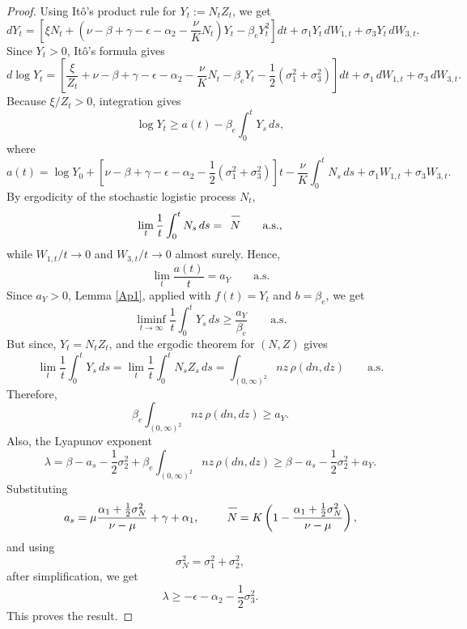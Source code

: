 \documentclass[12pt,a4paper,reqno]{amsart}
\theoremstyle{definition}
\theoremstyle{remark}
\theoremstyle{plain}
\let\svoverline\overline
\newcommand{\uc}[1]{\mkern 5mu\svoverline{\mkern-1mu#1\mkern-0.3mu \rule{0pt}{3.5mm}}\mkern 0mu}
\let\overline\uc
\begin{document}
\begin{proof}
Using It\^o's product rule for $Y_t:=N_tZ_t$, we get
$$
dY_t=\left[\xi N_t+\left(\nu-\beta+\gamma-\epsilon-\alpha_2
-\frac{\nu}{K}N_t\right)Y_t-\beta_eY_t^2\right]dt
+\sigma_1Y_t\,dW_{1,t}+\sigma_3Y_t\,dW_{3,t}.
$$
Since $Y_t>0$, It\^o's formula gives
$$
d\log Y_t=\left[\frac{\xi}{Z_t}+\nu-\beta+\gamma-\epsilon-\alpha_2-\frac{\nu}{K}N_t-\beta_eY_t-\frac12(\sigma_1^2+\sigma_3^2)
\right]dt+\sigma_1\,dW_{1,t}+\sigma_3\,dW_{3,t}.
$$
Because $\xi/Z_t>0$, integration gives
$$
\log Y_t \geq a(t)-\beta_e\int_0^tY_s\,ds,
$$
where
$$
a(t)=\log Y_0+\left[\nu-\beta+\gamma-\epsilon-\alpha_2
-\frac12(\sigma_1^2+\sigma_3^2)\right]t
-\frac{\nu}{K}\int_0^tN_s\,ds+\sigma_1W_{1,t}+\sigma_3W_{3,t}.
$$
By ergodicity of the stochastic logistic process $N_t$,
$$
\lim_t \frac1t\int_0^tN_s\,ds
=
\overline N
\qquad\text{a.s.},
$$
while $W_{1,t}/t\to0$ and $W_{3,t}/t\to0$ almost surely. Hence,
$$
\lim_t \frac{a(t)}{t}= a_Y
\qquad\text{a.s.}
$$
Since $a_Y>0$, Lemma \ref{Ap1}, applied with
$f(t)=Y_t$ and $b=\beta_e$, we get
$$
\liminf_{t\to\infty}
\frac1t\int_0^tY_s\,ds
\geq
\frac{a_Y}{\beta_e}
\qquad\text{a.s.}
$$
But since, $Y_t=N_tZ_t$, and the ergodic theorem for
$(N,Z)$ gives
$$
\lim_t \frac1t\int_0^tY_s\,ds
=\lim_t \frac1t\int_0^tN_sZ_s\,ds= \int_{(0,\infty)^2}nz\,\rho(dn,dz)
\qquad\text{a.s.}
$$
Therefore,
$$
\beta_e\int_{(0,\infty)^2}nz\,\rho(dn,dz)
\geq a_Y.
$$
Also, the Lyapunov exponent
$$
\lambda=\beta-a_s-\frac12\sigma_2^2+\beta_e\int_{(0,\infty)^2}nz\,\rho(dn,dz) \geq
\beta-a_s-\frac12\sigma_2^2+a_Y.
$$
Substituting
$$
a_s
=
\mu\frac{\alpha_1+\frac12\sigma_N^2}{\nu-\mu}
+\gamma+\alpha_1,
\qquad
\overline N
=
K\left(
1-\frac{\alpha_1+\frac12\sigma_N^2}{\nu-\mu}
\right),
$$
and using
$$
\sigma_N^2=\sigma_1^2+\sigma_2^2,
$$
after simplification, we get
$$
\lambda
\geq
-\epsilon-\alpha_2-\frac12\sigma_3^2.
$$
This proves the result.
\end{proof}
\end{document}

